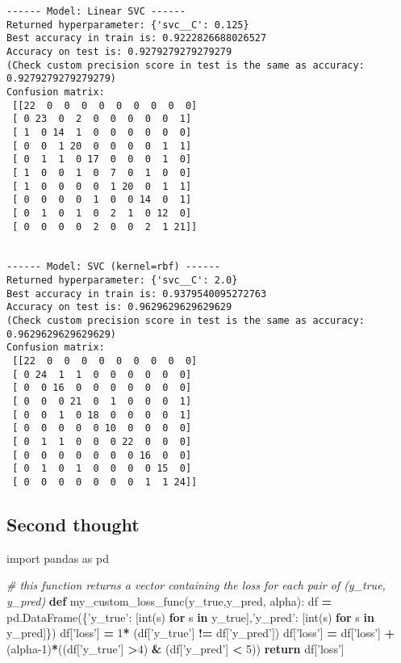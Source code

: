 \documentclass[10pt,a4paper]{article}
\newenvironment{Shaded}{\begin{snugshade}}{\end{snugshade}}
\newcommand{\BuiltInTok}[1]{#1}
\newcommand{\CommentTok}[1]{\textcolor[rgb]{0.56,0.35,0.01}{\textit{#1}}}
\newcommand{\ControlFlowTok}[1]{\textcolor[rgb]{0.13,0.29,0.53}{\textbf{#1}}}
\newcommand{\DecValTok}[1]{\textcolor[rgb]{0.00,0.00,0.81}{#1}}
\newcommand{\ImportTok}[1]{#1}
\newcommand{\KeywordTok}[1]{\textcolor[rgb]{0.13,0.29,0.53}{\textbf{#1}}}
\newcommand{\NormalTok}[1]{#1}
\newcommand{\OperatorTok}[1]{\textcolor[rgb]{0.81,0.36,0.00}{\textbf{#1}}}
\newcommand{\StringTok}[1]{\textcolor[rgb]{0.31,0.60,0.02}{#1}}
\theoremstyle{break}
\begin{document}
\begin{verbatim}
------ Model: Linear SVC ------ 
Returned hyperparameter: {'svc__C': 0.125}
Best accuracy in train is: 0.9222826688026527
Accuracy on test is: 0.9279279279279279
(Check custom precision score in test is the same as accuracy: 0.9279279279279279)
Confusion matrix: 
 [[22  0  0  0  0  0  0  0  0  0]
 [ 0 23  0  2  0  0  0  0  0  1]
 [ 1  0 14  1  0  0  0  0  0  0]
 [ 0  0  1 20  0  0  0  0  1  1]
 [ 0  1  1  0 17  0  0  0  1  0]
 [ 1  0  0  1  0  7  0  1  0  0]
 [ 1  0  0  0  0  1 20  0  1  1]
 [ 0  0  0  0  1  0  0 14  0  1]
 [ 0  1  0  1  0  2  1  0 12  0]
 [ 0  0  0  0  2  0  0  2  1 21]]


------ Model: SVC (kernel=rbf) ------ 
Returned hyperparameter: {'svc__C': 2.0}
Best accuracy in train is: 0.9379540095272763
Accuracy on test is: 0.9629629629629629
(Check custom precision score in test is the same as accuracy: 0.9629629629629629)
Confusion matrix: 
 [[22  0  0  0  0  0  0  0  0  0]
 [ 0 24  1  1  0  0  0  0  0  0]
 [ 0  0 16  0  0  0  0  0  0  0]
 [ 0  0  0 21  0  1  0  0  0  1]
 [ 0  0  1  0 18  0  0  0  0  1]
 [ 0  0  0  0  0 10  0  0  0  0]
 [ 0  1  1  0  0  0 22  0  0  0]
 [ 0  0  0  0  0  0  0 16  0  0]
 [ 0  1  0  1  0  0  0  0 15  0]
 [ 0  0  0  0  0  0  0  1  1 24]]
\end{verbatim}

\hypertarget{second-thought-1}{%
\subsection{Second thought}\label{second-thought-1}}

\begin{Shaded}
\begin{Highlighting}[]
\ImportTok{import}\NormalTok{ pandas }\ImportTok{as}\NormalTok{ pd}

\CommentTok{# this function returns a vector containing the loss for each pair of (y_true, y_pred)}
\KeywordTok{def}\NormalTok{ my_custom_loss_func(y_true,y_pred, alpha):}
\NormalTok{    df }\OperatorTok{=}\NormalTok{ pd.DataFrame(\{}\StringTok{'y_true'}\NormalTok{: [}\BuiltInTok{int}\NormalTok{(s) }\ControlFlowTok{for}\NormalTok{ s }\KeywordTok{in}\NormalTok{ y_true],}\StringTok{'y_pred'}\NormalTok{: [}\BuiltInTok{int}\NormalTok{(s) }\ControlFlowTok{for}\NormalTok{ s }\KeywordTok{in}\NormalTok{ y_pred]\})}
\NormalTok{    df[}\StringTok{'loss'}\NormalTok{] }\OperatorTok{=} \DecValTok{1}\OperatorTok{*}\NormalTok{ (df[}\StringTok{'y_true'}\NormalTok{] }\OperatorTok{!=}\NormalTok{ df[}\StringTok{'y_pred'}\NormalTok{])}
\NormalTok{    df[}\StringTok{'loss'}\NormalTok{] }\OperatorTok{=}\NormalTok{ df[}\StringTok{'loss'}\NormalTok{] }\OperatorTok{+}\NormalTok{ (alpha}\DecValTok{-1}\NormalTok{)}\OperatorTok{*}\NormalTok{((df[}\StringTok{'y_true'}\NormalTok{] }\OperatorTok{>}\DecValTok{4}\NormalTok{) }\OperatorTok{&}\NormalTok{ (df[}\StringTok{'y_pred'}\NormalTok{] }\OperatorTok{<} \DecValTok{5}\NormalTok{))}
    \ControlFlowTok{return}\NormalTok{ df[}\StringTok{'loss'}\NormalTok{]}
\end{Highlighting}
\end{Shaded}
\end{document}
